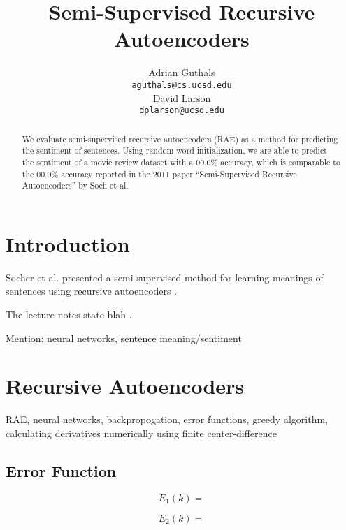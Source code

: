\documentclass{article}
\title{Semi-Supervised Recursive Autoencoders}
\author{
Adrian Guthals \\
\texttt{aguthals@cs.ucsd.edu} \\
\And
David Larson \\
\texttt{dplarson@ucsd.edu} \\
}
\begin{document}
\maketitle


\begin{abstract}
We evaluate semi-supervised recursive autoencoders (RAE) as a method for predicting the sentiment of sentences. Using random word initialization, we are able to predict the sentiment of a movie review dataset with a 00.0\% accuracy, which is comparable to the 00.0\% accuracy reported in the 2011 paper ``Semi-Supervised Recursive Autoencoders'' by Soch et al.
\end{abstract}



\section{Introduction}

Socher et al. presented a semi-supervised method for learning meanings of sentences using recursive autoencoders \cite{Socher}.

The lecture notes state blah \cite{CSE250B}.

Mention: neural networks, sentence meaning/sentiment



\section{Recursive Autoencoders}
RAE, neural networks, backpropogation, error functions, greedy algorithm, calculating derivatives numerically using finite center-difference


\subsection{Error Function}
\begin{equation}
    E_1 (k) =
\end{equation}

\begin{equation}
    E_2 (k) =
\end{equation}
\end{document}
